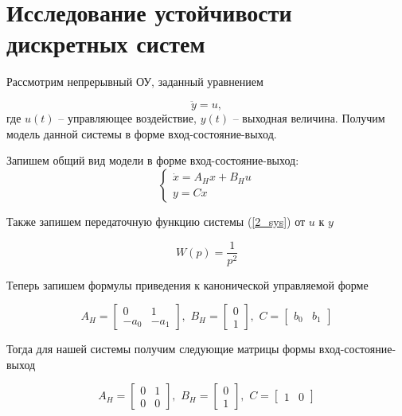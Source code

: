 \chapter{Исследование устойчивости дискретных систем}
\label{ch:chap2}
Рассмотрим непрерывный ОУ, заданный уравнением

\begin{equation}
	\label{2_sys}
	\ddot{y} = u,
\end{equation}
где $u(t)$ -- управляющее воздействие, $y(t)$ -- выходная величина. Получим модель данной системы в форме вход-состояние-выход. 

Запишем общий вид модели в форме вход-состояние-выход:
\begin{equation}
	\begin{cases}
		\dot{x} = A_H x + B_H u\\
		y = C x
	\end{cases}
\end{equation}

Также запишем передаточную функцию системы (\ref{2_sys}) от $u$ к $y$

\begin{equation}
	W(p) = \frac{1}{p^2}
\end{equation}

Теперь запишем формулы приведения к канонической управляемой форме

\begin{equation}
	A_H = \begin{bmatrix}
		0 & 1\\
		-a_0 & -a_1
	\end{bmatrix}, \, \, 
	B_H = \begin{bmatrix}
		0\\ 1
	\end{bmatrix}, \, \, 
	C = \begin{bmatrix}
		b_0 & b_1
	\end{bmatrix}
\end{equation}

Тогда для нашей системы получим следующие матрицы формы вход-состояние-выход

\begin{equation}
	A_H = \begin{bmatrix}
		0 & 1\\
		0 & 0
	\end{bmatrix}, \, \, 
	B_H = \begin{bmatrix}
		0\\ 1
	\end{bmatrix}, \, \, 
	C = \begin{bmatrix}
		1 & 0
	\end{bmatrix}
\end{equation}

